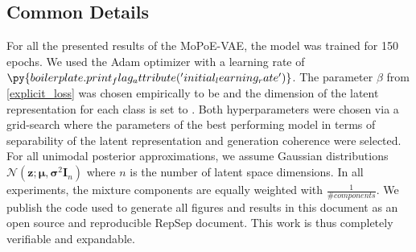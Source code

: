 \subsection{Common Details}
For all the presented results of the MoPoE-VAE, the model was trained for 150 epochs.
We used the Adam optimizer \cite{adam} with a learning rate of $\py{boilerplate.print_flag_attribute('initial_learning_rate')}$.
The parameter $\beta$ from \cref{explicit_loss} was chosen empirically to be  and the dimension of the latent representation for each class is set to .
Both hyperparameters were chosen via a grid-search where the parameters of the best performing model in terms of separability of the latent representation and generation coherence were selected.
For all unimodal posterior approximations, we assume Gaussian distributions $\mathcal{N}(\textbf{z}; \bm{\mu}, \bm{\sigma}^2\textbf{I}_n)$ where $n$ is the number of latent space dimensions.
In all experiments, the mixture components are equally weighted with $\frac{1}{\#components}$.
We publish \cite{mimic_repsep} the code used to generate all figures and results in this document as an open source and reproducible RepSep \cite{ioanas2018reproducible} document.
This work is thus completely verifiable and expandable.

